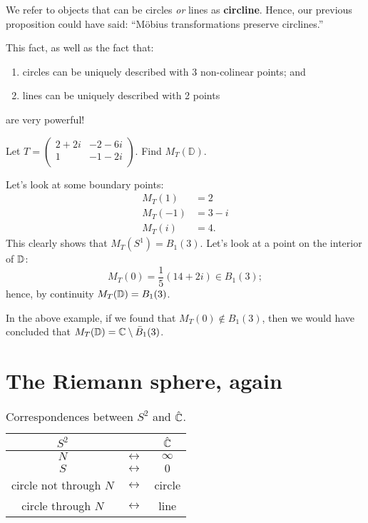 
We refer to objects that can be circles \emph{or} lines as \textbf{circline}.
Hence, our previous proposition could have said: ``M\"obius transformations preserve circlines.''

This fact, as well as the fact that:
\begin{enumerate}
    \item circles can be uniquely described with 3 non-colinear points; and
    \item lines can be uniquely described with 2 points
\end{enumerate}
are very powerful!

\begin{example}
    Let 
    $
        T = 
        \begin{pmatrix} 
            2 + 2i & -2 - 6i \\ 
            1      & -1-2i   \\ 
        \end{pmatrix}
        .
    $
    Find $M_T(\mathbb D)$.
\end{example}

\begin{solution}
    Let's look at some boundary points:
    \begin{align*}
        M_T(1)  &= 2     \\
        M_T(-1) &= 3 - i \\
        M_T(i)  &= 4.
    \end{align*}
    This clearly shows that 
    $M_T(S^1) = B_1(3)$.
    Let's look at a point on the interior of $\mathbb{D}$:
    \[ M_T(0) = \frac15(14 + 2i) \in B_1(3); \]
    hence, by continuity $M_T(\mathbb{D}) = B_1(3)$.
\end{solution}

In the above example, if we found that $M_T(0) \not\in B_1(3)$, then we would have concluded that $M_T(\mathbb{D}) = \mathbb{C} \setminus \bar B_1(3)$.

\section{The Riemann sphere, again}

\begin{table}
    \centering
    \caption{Correspondences between $S^2$ and $\hat {\mathbb{C}}$.}
        \label{tab:c-to-s}
    \begin{tabular}{ccc}
        \toprule
        $S^2$ && $\hat {\mathbb{C}}$ \\
        \midrule
        $N$                    & $\longleftrightarrow$ & $\infty$ \\
        $S$                    & $\longleftrightarrow$ & $0$      \\
        circle not through $N$ & $\longleftrightarrow$ & circle   \\
        circle through $N$     & $\longleftrightarrow$ & line     \\
        \bottomrule
    \end{tabular}
\end{table}

